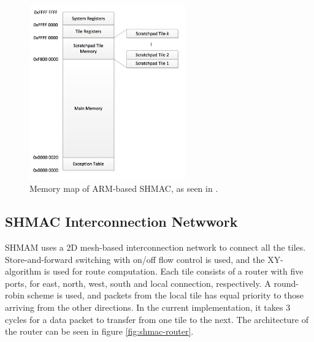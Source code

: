 \begin{figure}[htb]
    \centering
    \includegraphics[width=0.6\textwidth]{Figures/Heterogeneous/SHMACMemory}
    \caption{Memory map of ARM-based SHMAC, as seen in \cite{shmac-plan}.}
    \label{fig:shmac-memory}
\end{figure}



\subsection{SHMAC Interconnection Netwwork}
SHMAM uses a 2D mesh-based interconnection network to connect all the tiles.
Store-and-forward switching with on/off flow control is used, and the XY-algorithm is used for route computation.
Each tile consists of a router with five ports, for east, north, west, south and local connection, respectively.
A round-robin scheme is used, and packets from the local tile has equal priority to those arriving from the other directions.
In the current implementation, it takes 3 cycles for a data packet to transfer from one tile to the next. 
The architecture of the router can be seen in figure \ref{fig:shmac-router}.

